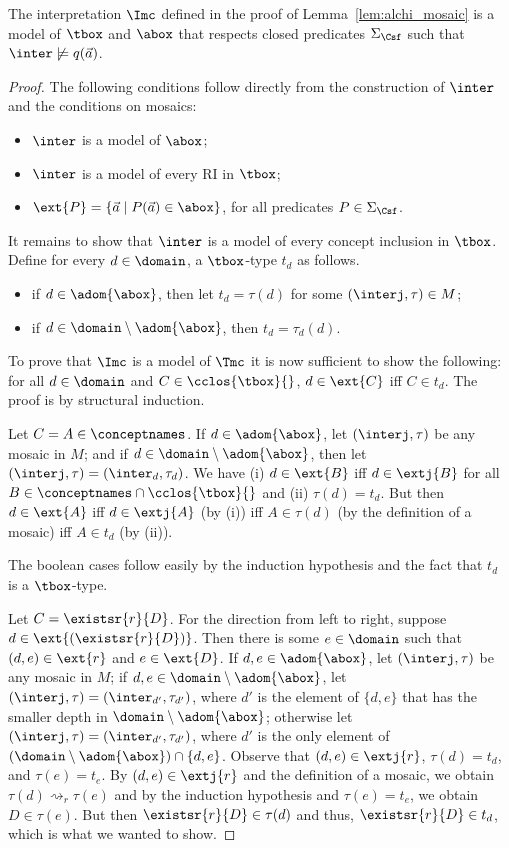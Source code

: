 \documentclass{lmcs}
\theoremstyle{definition}
\begin{document}
\begin{lem}
The interpretation $\Imc$ defined in the proof of Lemma~\ref{lem:alchi_mosaic} is a model of $\tbox$ and $\abox$ 
that respects closed predicates $\Sigma_\Csf$ such that $\inter\not\models q(\vec{a})$.
\end{lem}
\begin{proof}
The following conditions follow directly from the construction of $\inter$ and the conditions on mosaics:
    \begin{itemize}
    \item $\inter$ is a model of $\abox$;
    \item $\inter$ is a model of every RI in $\tbox$;
    \item $\ext{P}=\{\vec{a}\mid P(\vec{a})\in\abox\}$, for all predicates $P\in \Sigma_{\Csf}$.
    \end{itemize}
    It remains to show that $\inter$ is a model of every concept
    inclusion in $\tbox$. Define for every $d\in\domain$, a
    $\tbox$-type $t_d$ as follows.
    \begin{itemize}
    \item if $d\in\adom{\abox}$, then let $t_d=\tau(d)$ for some
      $(\interj,\tau)\in M$;
    \item if $d\in\domain\setminus\adom{\abox}$, then $t_d=\tau_d(d)$.
    \end{itemize}
    To prove that $\Imc$ is a model of $\Tmc$ it is now sufficient
    to show the following: for all $d\in\domain$ and
    $C\in\cclos{\tbox}{}$, $d\in\ext{C}$ iff $C\in t_d$. The proof is
    by structural induction.

    Let $C=A\in\conceptnames$. If $d\in\adom{\abox}$, let
    $(\interj,\tau)$ be any mosaic in $M$; and if
    $d\in\domain\setminus\adom{\abox}$, then let
    $(\interj,\tau)=(\inter_d,\tau_d)$. We have (i) $d\in\ext{B}$ iff
    $d\in \extj{B}$ for all $B\in\conceptnames\cap\cclos{\tbox}{}$ and
    (ii) $\tau(d)=t_d$. But then $d\in\ext{A}$ iff $d\in\extj{A}$ (by
    (i)) iff $A\in\tau(d)$ (by the definition of a mosaic) iff $A\in
    t_d$ (by (ii)).

    The boolean cases follow easily by the induction hypothesis and
    the fact that $t_d$ is a $\tbox$-type.

    Let $C=\existsr{r}{D}$. For the direction from left to right,
    suppose $d\in\ext{(\existsr{r}{D})}$. Then there is some
    $e\in\domain$ such that $(d,e)\in\ext{r}$ and $e\in\ext{D}$. If
    $d,e\in\adom{\abox}$, let $(\interj,\tau)$ be any mosaic in $M$;
    if $d,e\in\domain\setminus\adom{\abox}$, let
    $(\interj,\tau)=(\inter_{d'},\tau_{d'})$, where $d'$ is the
    element of $\{d,e\}$ that has the smaller depth in
    $\domain\setminus\adom{\abox}$; otherwise let
    $(\interj,\tau)=(\inter_{d'},\tau_{d'})$, where $d'$ is the only
    element of $(\domain\setminus\adom{\abox})\cap\{d,e\}$. Observe
    that $(d,e)\in\extj{r}$, $\tau(d)=t_d$, and $\tau(e)=t_e$. By
    $(d,e)\in\extj{r}$ and the definition of a mosaic, we obtain
    $\tau(d)\rightsquigarrow_r\tau(e)$ and by the induction hypothesis
    and $\tau(e)=t_e$, we obtain $D\in\tau(e)$. But then
    $\existsr{r}{D}\in\tau(d)$ and thus, $\existsr{r}{D}\in t_d$,
    which is what we wanted to show.


\end{proof}
\end{document}
